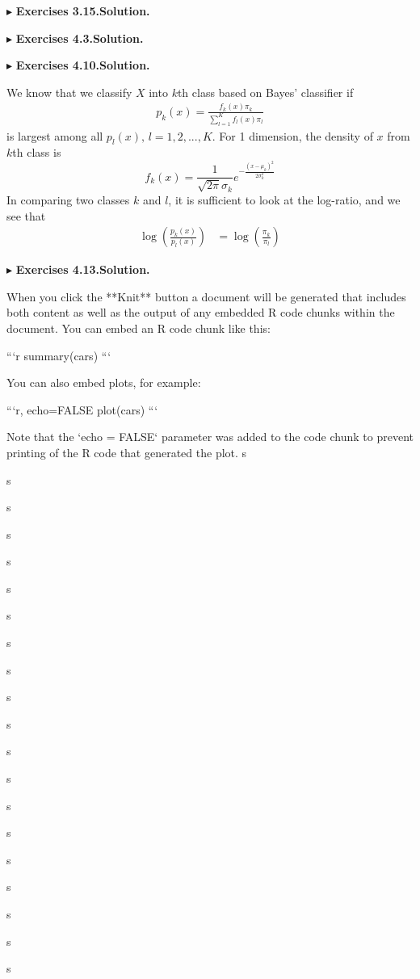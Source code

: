 \documentclass[letterpaper, 10pt]{article}\usepackage[]{graphicx}\usepackage[]{color}
\newcommand{\ba}{$$\begin{aligned}}
\newcommand{\ea}{\end{aligned}$$}
\begin{document}
$\blacktriangleright$ \textbf{Exercises 3.15.\quad Solution.}






$\blacktriangleright$ \textbf{Exercises 4.3.\quad Solution.}





$\blacktriangleright$ \textbf{Exercises 4.10.\quad Solution.} 

We know that we classify $X$ into $k$th class based on Bayes' classifier if
\ba
{p_k (x)}=\frac{f_k(x)\pi_k}{\sum_{l=1}^{K}f_l(x)\pi_l}
\ea
is largest among all $p_l(x),\, l=1,2,...,K$. For 1 dimension, the density of $x$ from $k$th class is 
$$
{f_k(x)}={\frac{1}{\sqrt{2\pi}\sigma_k}}e^{-\frac{(x-\mu_k)^2}{2\sigma_k^2}} 
$$
In comparing two classes $k$ and $l$, it is sufficient to look at the log-ratio, and we see that
\ba
\log\left(\frac{p_k(x)}{p_l(x)}\right)&=\log\left(\frac{\pi_k}{\pi_l}\right)
	\ea





	$\blacktriangleright$ \textbf{Exercises 4.13.\quad Solution.} 




	When you click the **Knit** button a document will be generated that includes both content as well as the output of any embedded R code chunks within the document. You can embed an R code chunk like this:

	```{r}
	summary(cars)
	```

	You can also embed plots, for example:

	```{r, echo=FALSE}
	plot(cars)
	```

	Note that the `echo = FALSE` parameter was added to the code chunk to prevent printing of the R code that generated the plot.
	s

	s

	s

	s

	s

	s

	s

	s

	s

	s

	s

	s

	s

	s

	s

	s

	s

	s

	s

	s
\end{document}
